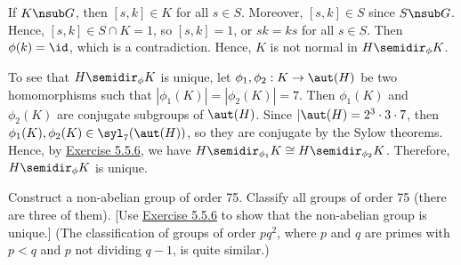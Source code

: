 \begin{solalph}
    If $K \nsub G$, then $[s, k] \in K$ for all $s \in S$. Moreover, $[s, k] \in S$ since $S \nsub G$. Hence, $[s, k] \in S \cap K = 1$, so $[s, k] = 1$, or $sk = ks$ for all $s \in S$. Then $\phi(k) = \id$, which is a contradiction. Hence, $K$ is not normal in $H \semidir_\phi K$.

    To see that $H \semidir_\phi K$ is unique, let $\phi_1, \phi_2 : K \to \aut(H)$ be two homomorphisms such that $|\phi_1(K)| = |\phi_2(K)| = 7$. Then $\phi_1(K)$ and $\phi_2(K)$ are conjugate subgroups of $\aut(H)$. Since $|\aut(H) = 2^3 \cdot 3 \cdot 7$, then $\phi_1(K), \phi_2(K) \in \syl_7(\aut(H))$, so they are conjugate by the Sylow theorems. Hence, by \hyperref[ex5.5.6]{Exercise 5.5.6}, we have $H \semidir_{\phi_1} K \cong H \semidir_{\phi_2} K$. Therefore, $H \semidir_\phi K$ is unique.
\end{solalph}

\begin{exercise}\label{ex5.5.8}
    Construct a non-abelian group of order 75. Classify all groups of order 75 (there are three of them). [Use \hyperref[ex5.5.6]{Exercise 5.5.6} to show that the non-abelian group is unique.] (The classification of groups of order $pq^2$, where $p$ and $q$ are primes with $p < q$ and $p$ not dividing $q - 1$, is quite similar.)
\end{exercise}

